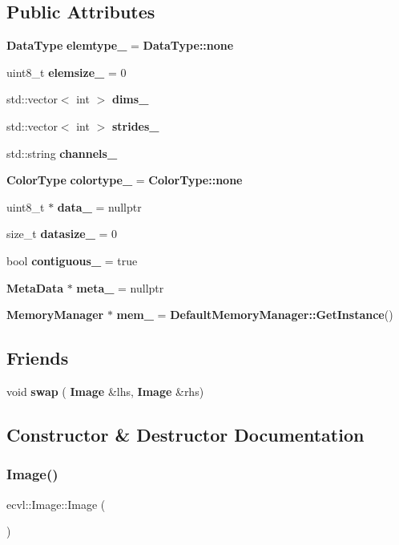 \subsection*{Public Attributes}
\begin{DoxyCompactItemize}
\item 
\textbf{ Data\+Type} \textbf{ elemtype\+\_\+} = \textbf{ Data\+Type\+::none}
\item 
uint8\+\_\+t \textbf{ elemsize\+\_\+} = 0
\item 
std\+::vector$<$ int $>$ \textbf{ dims\+\_\+}
\item 
std\+::vector$<$ int $>$ \textbf{ strides\+\_\+}
\item 
std\+::string \textbf{ channels\+\_\+}
\item 
\textbf{ Color\+Type} \textbf{ colortype\+\_\+} = \textbf{ Color\+Type\+::none}
\item 
uint8\+\_\+t $\ast$ \textbf{ data\+\_\+} = nullptr
\item 
size\+\_\+t \textbf{ datasize\+\_\+} = 0
\item 
bool \textbf{ contiguous\+\_\+} = true
\item 
\textbf{ Meta\+Data} $\ast$ \textbf{ meta\+\_\+} = nullptr
\item 
\textbf{ Memory\+Manager} $\ast$ \textbf{ mem\+\_\+} = \textbf{ Default\+Memory\+Manager\+::\+Get\+Instance}()
\end{DoxyCompactItemize}
\subsection*{Friends}
\begin{DoxyCompactItemize}
\item 
void \textbf{ swap} (\textbf{ Image} \&lhs, \textbf{ Image} \&rhs)
\end{DoxyCompactItemize}


\subsection{Constructor \& Destructor Documentation}
\mbox{\label{classecvl_1_1_image_a6102d86ab9b3eb71552dddd6536dfe8b}} 
\subsubsection{Image()\hspace{0.1cm}{\footnotesize\ttfamily [1/4]}}
{\footnotesize\ttfamily ecvl\+::\+Image\+::\+Image (\begin{DoxyParamCaption}{ }\end{DoxyParamCaption})\hspace{0.3cm}{\ttfamily [inline]}}

